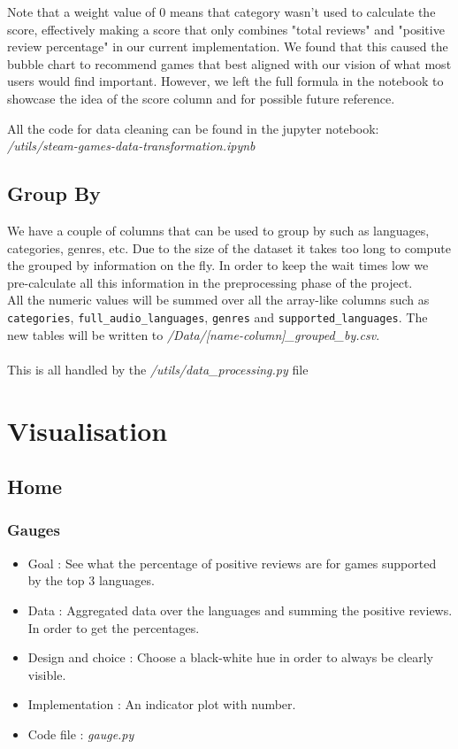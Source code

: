 \documentclass{article}
\begin{document}
    Note that a weight value of 0 means that category wasn't used to calculate the score, effectively making a score that only combines "total reviews" and "positive review percentage" in our current implementation. We found that this caused the bubble chart to recommend games that best aligned with our vision of what most users would find important. However, we left the full formula in the notebook to showcase the idea of the score column and for possible future reference.
    
	All the code for data cleaning can be found in the jupyter notebook: \textit{/utils/steam-games-data-transformation.ipynb}
	
	\subsection{Group By}
	
	We have a couple of columns that can be used to group by such as languages, categories, genres, etc. Due to the size of the dataset it takes too long to compute the grouped by information on the fly. In order to keep the wait times low we pre-calculate all this information in the preprocessing phase of the project.\\
	All the numeric values will be summed over all the array-like columns such as \texttt{categories}, \texttt{full\_audio\_languages}, \texttt{genres} and \texttt{supported\_languages}. The new tables will be written to \textit{/Data/[name-column]\_grouped\_by.csv}.\\
	\\
	This is all handled by the \textit{/utils/data\_processing.py} file
	\newpage
	
	\section{Visualisation}
	\subsection{Home}

	\subsubsection{Gauges}
	
	\begin{itemize}
		\item Goal : See what the percentage of positive reviews are for games supported by the top 3 languages.
		\item Data : Aggregated data over the languages and summing the positive reviews. In order to get the percentages.
		\item Design and choice : Choose a black-white hue in order to always be clearly visible.
		\item Implementation : An indicator plot with number.
		\item Code file : \textit{gauge.py}
	\end{itemize}
	
\end{document}
